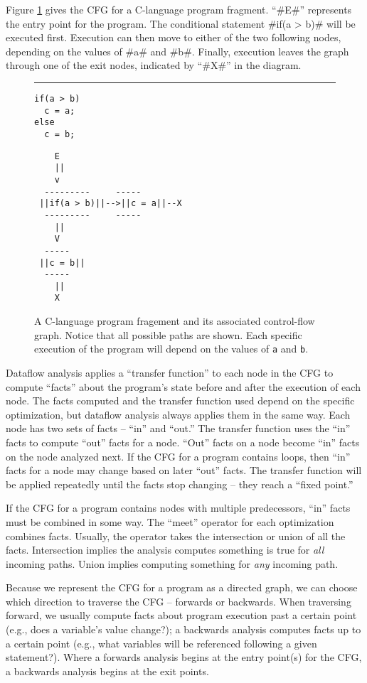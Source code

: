 \documentclass[12pt]{report}
\begin{document}
Figure \ref{fig_back1} gives the CFG for a C-language program
fragment.  ``#E#'' represents the entry point for the program. The
conditional statement #if(a > b)# will be executed first. Execution
can then move to either of the two following nodes, depending on the
values of #a# and #b#. Finally, execution leaves the graph through one of
the exit nodes, indicated by ``#X#'' in the diagram.

\begin{figure}[th]\centering
\rule{\linewidth-}{0.4pt}
\begin{Verbatim}
if(a > b)
  c = a;
else
  c = b;
\end{Verbatim}
\begin{Verbatim}
    E
    ||
    v
  ---------     -----
 ||if(a > b)||-->||c = a||--X
  ---------     -----
    ||
    V
  -----
 ||c = b||
  -----
    ||
    X
\end{Verbatim}
\caption{A C-language program fragement and its associated
  control-flow graph. Notice that all possible paths are shown. Each
  specific execution of the program will depend on the values of \verb=a=
  and \verb=b=.}
\label{fig_back1}
\end{figure}

Dataflow analysis applies a ``transfer function'' to each node in the
CFG to compute ``facts'' about the program's state before and after
the execution of each node. The facts computed and the transfer
function used depend on the specific optimization, but dataflow
analysis always applies them in the same way. Each node has two sets
of facts -- ``in'' and ``out.'' The transfer function uses the ``in''
facts to compute ``out'' facts for a node. ``Out'' facts on a node
become ``in'' facts on the node analyzed next.  If the CFG for a
program contains loops, then ``in'' facts for a node may change based
on later ``out'' facts. The transfer function will be applied
repeatedly until the facts stop changing -- they reach a ``fixed
point.''

If the CFG for a program contains nodes with multiple predecessors,
``in'' facts must be combined in some way. The ``meet'' operator for
each optimization combines facts. Usually, the operator takes the 
intersection or union of all the facts. Intersection implies the 
analysis computes something is true for \emph{all} incoming paths. Union
implies computing something for \emph{any} incoming path.

Because we represent the CFG for a program as a directed graph, we can
choose which direction to traverse the CFG -- forwards or backwards.
When traversing forward, we usually compute facts about program
execution past a certain point (e.g., does a variable's value
change?); a backwards analysis computes facts up to a certain point
(e.g., what variables will be referenced following a given
statement?). Where a forwards analysis begins at the entry point(s)
for the CFG, a backwards analysis begins at the exit points.
\end{document}
